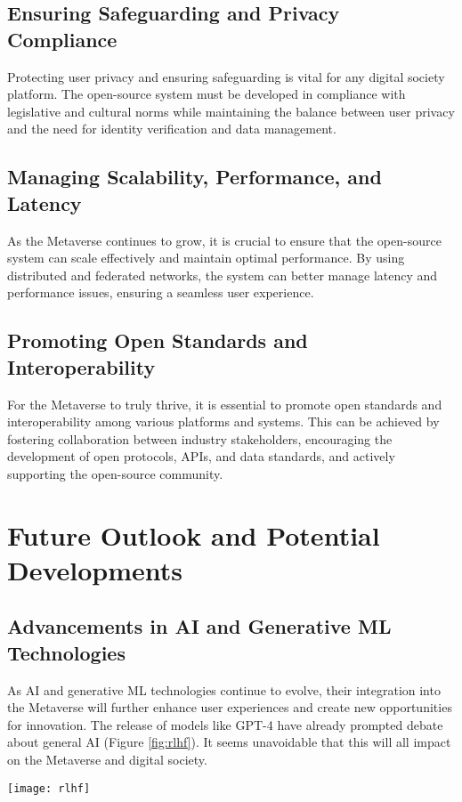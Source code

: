 \subsection{Ensuring Safeguarding and Privacy Compliance}
Protecting user privacy and ensuring safeguarding is vital for any digital society platform. The open-source system must be developed in compliance with legislative and cultural norms while maintaining the balance between user privacy and the need for identity verification and data management.

\subsection{Managing Scalability, Performance, and Latency}
As the Metaverse continues to grow, it is crucial to ensure that the open-source system can scale effectively and maintain optimal performance. By using distributed and federated networks, the system can better manage latency and performance issues, ensuring a seamless user experience.

\subsection{Promoting Open Standards and Interoperability}
For the Metaverse to truly thrive, it is essential to promote open standards and interoperability among various platforms and systems. This can be achieved by fostering collaboration between industry stakeholders, encouraging the development of open protocols, APIs, and data standards, and actively supporting the open-source community.

\section{Future Outlook and Potential Developments}
\subsection{Advancements in AI and Generative ML Technologies}
As AI and generative ML technologies continue to evolve, their integration into the Metaverse will further enhance user experiences and create new opportunities for innovation. The release of models like GPT-4 have already prompted debate about general AI \cite{bubeck2023sparks, perez2022discovering} (Figure \ref{fig:rlhf}). It seems unavoidable that this will all impact on the Metaverse and digital society.

\begin{figure*}[ht]\centering 	\texttt{[image: rlhf]}
	\caption{Models exhibit uncanny behaviours.}
	\label{fig:rlhf}
\end{figure*}


